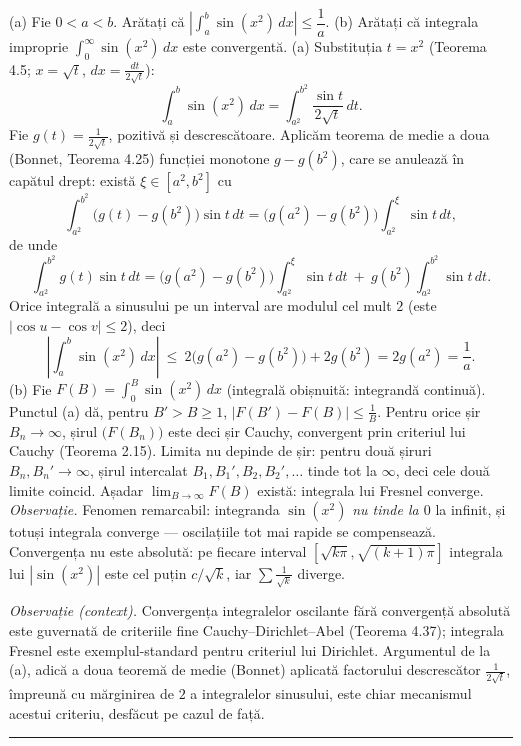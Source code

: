 (a) Fie $0<a<b$. Arătați că $\left|\displaystyle\int_a^b\sin(x^2)\,dx\right|\le\dfrac1a$.
(b) Arătați că integrala improprie $\displaystyle\int_0^\infty\sin(x^2)\,dx$ este convergentă.
\sol (a) Substituția $t=x^2$ (Teorema 4.5; $x=\sqrt t$, $dx=\frac{dt}{2\sqrt t}$):
\[ \int_a^b\sin(x^2)\,dx=\int_{a^2}^{b^2}\frac{\sin t}{2\sqrt t}\,dt . \]
Fie $g(t)=\frac1{2\sqrt t}$, pozitivă și descrescătoare. Aplicăm teorema de medie a doua (Bonnet, Teorema 4.25) funcției monotone $g-g(b^2)$, care se anulează în capătul drept: există $\xi\in[a^2,b^2]$ cu
\[ \int_{a^2}^{b^2}\bigl(g(t)-g(b^2)\bigr)\sin t\,dt=\bigl(g(a^2)-g(b^2)\bigr)\int_{a^2}^{\xi}\sin t\,dt , \]
de unde
\[ \int_{a^2}^{b^2}g(t)\sin t\,dt=\bigl(g(a^2)-g(b^2)\bigr)\int_{a^2}^{\xi}\sin t\,dt\ +\ g(b^2)\int_{a^2}^{b^2}\sin t\,dt . \]
Orice integrală a sinusului pe un interval are modulul cel mult $2$ (este $|\cos u-\cos v|\le2$), deci
\[ \left|\int_a^b\sin(x^2)\,dx\right|\ \le\ 2\bigl(g(a^2)-g(b^2)\bigr)+2g(b^2)=2g(a^2)=\frac1a . \]
(b) Fie $F(B)=\int_0^B\sin(x^2)\,dx$ (integrală obișnuită: integrandă continuă). Punctul (a) dă, pentru $B'>B\ge1$, $|F(B')-F(B)|\le\frac1B$. Pentru orice șir $B_n\to\infty$, șirul $\bigl(F(B_n)\bigr)$ este deci șir Cauchy, convergent prin criteriul lui Cauchy (Teorema 2.15). Limita nu depinde de șir: pentru două șiruri $B_n,B_n'\to\infty$, șirul intercalat $B_1,B_1',B_2,B_2',\dots$ tinde tot la $\infty$, deci cele două limite coincid. Așadar $\lim_{B\to\infty}F(B)$ există: integrala lui Fresnel converge.\\[2pt]
\emph{Observație.} Fenomen remarcabil: integranda $\sin(x^2)$ \emph{nu tinde la $0$} la infinit, și totuși integrala converge --- oscilațiile tot mai rapide se compensează. Convergența nu este absolută: pe fiecare interval $[\sqrt{k\pi},\sqrt{(k+1)\pi}]$ integrala lui $|\sin(x^2)|$ este cel puțin $c/\sqrt k$, iar $\sum\frac1{\sqrt k}$ diverge.

\emph{Observație (context).} Convergența integralelor oscilante fără convergență absolută este guvernată de criteriile fine Cauchy--Dirichlet--Abel (Teorema 4.37); integrala Fresnel este exemplul-standard pentru criteriul lui Dirichlet. Argumentul de la (a), adică a doua teoremă de medie (Bonnet) aplicată factorului descrescător $\frac1{2\sqrt t}$, împreună cu mărginirea de $2$ a integralelor sinusului, este chiar mecanismul acestui criteriu, desfăcut pe cazul de față.
\vspace{1mm}\hrule

